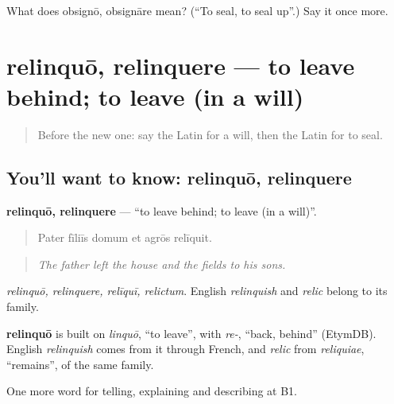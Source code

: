 \begin{tcolorbox}[breakable,colback=teal!4,colframe=teal!35!black,title={Before you move on}]
What does obsignō, obsignāre mean? (\textquotedblleft{}To seal, to seal up\textquotedblright{}.) Say it once more.
\end{tcolorbox}
\section[relinquō, relinquere]{relinquō, relinquere — to leave behind; to leave (in a will)}

\label{lesson:LA-C332-relinquo}



\begin{quote}
Before the new one: say the Latin for a will, then the Latin for to seal.
\end{quote}

\subsection*{You'll want to know: relinquō, relinquere}
\textbf{relinquō, relinquere} — \textquotedblleft{}to leave behind; to leave (in a will)\textquotedblright{}.

\begin{quote}
Pater fīliīs domum et agrōs relīquit.
\end{quote}

\begin{quote}
\emph{The father left the house and the fields to his sons.}
\end{quote}

\emph{relinquō, relinquere, relīquī, relictum}. English \emph{relinquish} and \emph{relic} belong to its family.

\begin{cousinweb}
\textbf{relinquō} is built on \emph{linquō}, \textquotedblleft{}to leave\textquotedblright{}, with \emph{re-}, \textquotedblleft{}back, behind\textquotedblright{} (EtymDB). English \emph{relinquish} comes from it through French, and \emph{relic} from \emph{reliquiae}, \textquotedblleft{}remains\textquotedblright{}, of the same family.
\end{cousinweb}

\begin{grammarlens}[title={What you've built}]
One more word for telling, explaining and describing at B1.
\end{grammarlens}

